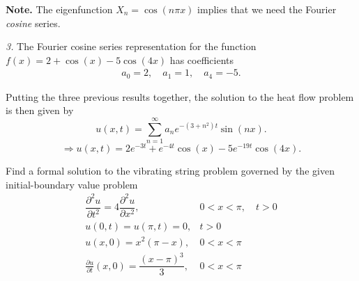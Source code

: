 \documentclass[11pt]{article}
\begin{document}
\begin{solution}
\textbf{Note.} The eigenfunction $X_{n}=\cos(n\pi x)$ implies that we need the Fourier \textsl{cosine} series.

\textsl{3. } The Fourier cosine series representation for the function $f(x)=2+\cos(x)-5\cos(4x)$ has coefficients
\begin{eqnarray*}
\boxed{a_{0} = 2, \quad a_{1} = 1, \quad a_{4} = -5}.
\end{eqnarray*}

Putting the three previous results together, the solution to the heat flow problem is then given by
\[u(x,t) = \sum_{n=1}^{\infty}a_{n}e^{-(3+ n^{2})t}\sin (n x).\]
\[\Rightarrow
\boxed{u(x,t) = 2e^{-3t}+e^{-4t}\cos(x)-5e^{-19t}\cos(4x)}.
\]


\end{solution}







\begin{problem}
Find a formal solution to the vibrating string problem governed by the given initial-boundary value problem
\begin{equation*} \begin{array}{lr}
\dfrac{ \partial^2 u }{\partial t^2} =  4 \dfrac{ \partial^2 u }{\partial x^2} , & 0<x<\pi, \quad t>0 \\
 u(0,t)  =  u(\pi,t) =0,  & t>0 \\
 u(x,0)  =  x^2(\pi-x), & 0<x<\pi \\
 \frac{ \partial u }{\partial t}(x,0) =  \dfrac{(x-\pi)^3}{3}, & 0<x<\pi 
\end{array}\end{equation*}
\end{problem}
\end{document}
